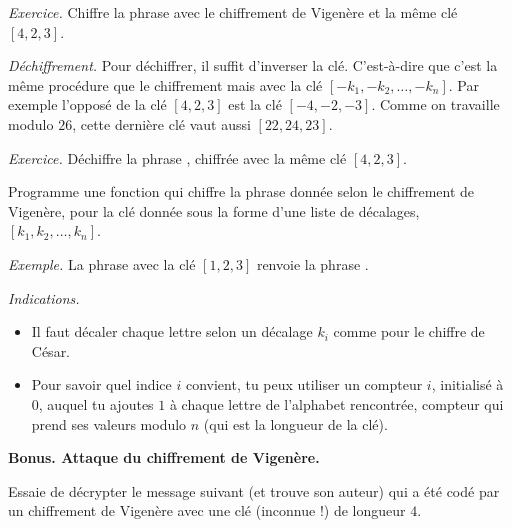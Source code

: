 \documentclass[11pt,class=report,crop=false]{standalone}
\begin{document}
\begin{cours}
\bigskip

\emph{Exercice.} Chiffre la phrase  avec le chiffrement de Vigenère et la même clé $[4,2,3]$.

\bigskip

\emph{Déchiffrement.} Pour déchiffrer, il suffit d'inverser la clé. C'est-à-dire que c'est la même procédure que le chiffrement mais avec la clé $[-k_1,-k_2,\ldots,-k_n]$.
Par exemple l'opposé de la clé $[4,2,3]$ est la clé $[-4,-2,-3]$. Comme on travaille modulo $26$, cette dernière clé vaut aussi $[22,24,23]$.

\emph{Exercice.} Déchiffre la phrase , chiffrée avec la même clé $[4,2,3]$.
\end{cours}



\begin{activite}




Programme une fonction  qui chiffre la phrase donnée selon le chiffrement de Vigenère, pour la clé donnée sous la forme d'une liste de décalages,  $[k_1,k_2,\ldots,k_n]$.

\medskip

\emph{Exemple.}
La phrase  avec la clé $[1,2,3] $ renvoie la phrase .

\medskip

\emph{Indications.} 
\begin{itemize}
  \item Il faut décaler chaque lettre selon un décalage $k_i$ comme pour le chiffre de César.
  \item Pour savoir quel indice $i$ convient, tu peux utiliser un compteur $i$, initialisé à $0$, auquel tu ajoutes $1$ à chaque lettre de l'alphabet rencontrée, compteur qui prend ses valeurs modulo $n$ (qui est la longueur de la clé).
  
\end{itemize}

\bigskip

\textbf{Bonus. Attaque du chiffrement de Vigenère.}

Essaie de décrypter le message suivant (et trouve son auteur) qui a été codé par un chiffrement de Vigenère avec une clé (inconnue !) de longueur $4$.
 
\begin{center}
\end{center} 

\end{activite}

\end{document}
